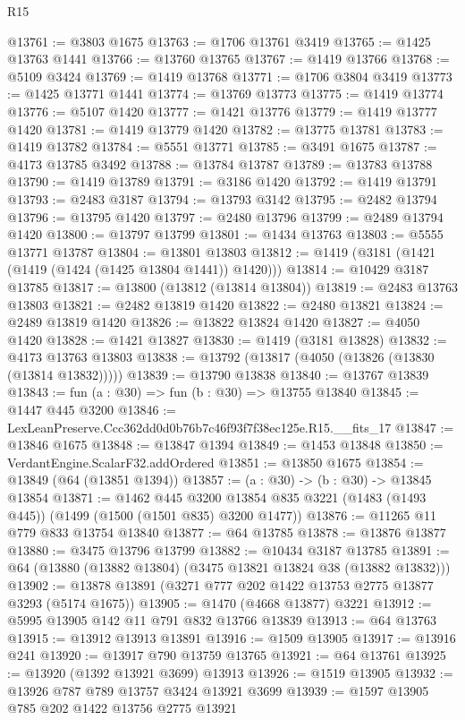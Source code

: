 \begin{lexlean}{R15}
\begin{coremodule}
@13761 := @3803 @1675
@13763 := @1706 @13761 @3419
@13765 := @1425 @13763 @1441
@13766 := @13760 @13765
@13767 := @1419 @13766
@13768 := @5109 @3424
@13769 := @1419 @13768
@13771 := @1706 @3804 @3419
@13773 := @1425 @13771 @1441
@13774 := @13769 @13773
@13775 := @1419 @13774
@13776 := @5107 @1420
@13777 := @1421 @13776
@13779 := @1419 @13777 @1420
@13781 := @1419 @13779 @1420
@13782 := @13775 @13781
@13783 := @1419 @13782
@13784 := @5551 @13771
@13785 := @3491 @1675
@13787 := @4173 @13785 @3492
@13788 := @13784 @13787
@13789 := @13783 @13788
@13790 := @1419 @13789
@13791 := @3186 @1420
@13792 := @1419 @13791
@13793 := @2483 @3187
@13794 := @13793 @3142
@13795 := @2482 @13794
@13796 := @13795 @1420
@13797 := @2480 @13796
@13799 := @2489 @13794 @1420
@13800 := @13797 @13799
@13801 := @1434 @13763
@13803 := @5555 @13771 @13787
@13804 := @13801 @13803
@13812 := @1419 (@3181 (@1421 (@1419 (@1424 (@1425 @13804 @1441)) @1420)))
@13814 := @10429 @3187 @13785
@13817 := @13800 (@13812 (@13814 @13804))
@13819 := @2483 @13763 @13803
@13821 := @2482 @13819 @1420
@13822 := @2480 @13821
@13824 := @2489 @13819 @1420
@13826 := @13822 @13824 @1420
@13827 := @4050 @1420
@13828 := @1421 @13827
@13830 := @1419 (@3181 @13828)
@13832 := @4173 @13763 @13803
@13838 := @13792 (@13817 (@4050 (@13826 (@13830 (@13814 @13832)))))
@13839 := @13790 @13838
@13840 := @13767 @13839
@13843 := fun (a : @30) => fun (b : @30) => @13755 @13840
@13845 := @1447 @445 @3200
@13846 := LexLeanPreserve.Ccc362dd0d0b76b7c46f93f7f38ec125e.R15.__fits_17
@13847 := @13846 @1675
@13848 := @13847 @1394
@13849 := @1453 @13848
@13850 := VerdantEngine.ScalarF32.addOrdered
@13851 := @13850 @1675
@13854 := @13849 (@64 (@13851 @1394))
@13857 := (a : @30) -> (b : @30) -> @13845 @13854
@13871 := @1462
    @445
    @3200
    @13854
    @835
    @3221
    (@1483 (@1493 @445))
    (@1499 (@1500 (@1501 @835) @3200 @1477))
@13876 := @11265 @11 @779 @833 @13754 @13840
@13877 := @64 @13785
@13878 := @13876 @13877
@13880 := @3475 @13796 @13799
@13882 := @10434 @3187 @13785
@13891 := @64 (@13880 (@13882 @13804) (@3475 @13821 @13824 @38 (@13882 @13832)))
@13902 := @13878 @13891 (@3271 @777 @202 @1422 @13753 @2775 @13877 @3293 (@5174 @1675))
@13905 := @1470 (@4668 @13877) @3221
@13912 := @5995 @13905 @142 @11 @791 @832 @13766 @13839
@13913 := @64 @13763
@13915 := @13912 @13913 @13891
@13916 := @1509 @13905
@13917 := @13916 @241
@13920 := @13917 @790 @13759 @13765
@13921 := @64 @13761
@13925 := @13920 (@1392 @13921 @3699) @13913
@13926 := @1519 @13905
@13932 := @13926 @787 @789 @13757 @3424 @13921 @3699
@13939 := @1597 @13905 @785 @202 @1422 @13756 @2775 @13921

\end{coremodule}
\end{lexlean}
